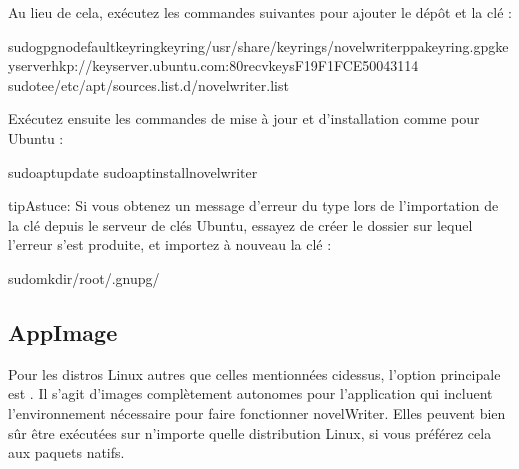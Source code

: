 \documentclass[a4paper,11pt,french]{sphinxmanual}
\begin{document}
\sphinxAtStartPar
Au lieu de cela, exécutez les commandes suivantes pour ajouter le dépôt et la clé :

\begin{sphinxVerbatim}[commandchars=\\\{\}]
sudogpg\PYGZhy{}\PYGZhy{}no\PYGZhy{}default\PYGZhy{}keyring\PYGZhy{}\PYGZhy{}keyring/usr/share/keyrings/novelwriter\PYGZhy{}ppa\PYGZhy{}keyring.gpg\PYGZhy{}\PYGZhy{}keyserverhkp://keyserver.ubuntu.com:80\PYGZhy{}\PYGZhy{}recv\PYGZhy{}keysF19F1FCE50043114
sudotee/etc/apt/sources.list.d/novelwriter.list
\end{sphinxVerbatim}

\sphinxAtStartPar
Exécutez ensuite les commandes de mise à jour et d’installation comme pour Ubuntu :

\begin{sphinxVerbatim}[commandchars=\\\{\}]
sudoaptupdate
sudoaptinstallnovelwriter
\end{sphinxVerbatim}

\begin{sphinxadmonition}{tip}{Astuce:}
\sphinxAtStartPar
Si vous obtenez un message d’erreur du type  lors de l’importation de la clé depuis le serveur de clés Ubuntu, essayez de créer le dossier sur lequel l’erreur s’est produite, et importez à nouveau la clé :

\begin{sphinxVerbatim}[commandchars=\\\{\}]
sudomkdir/root/.gnupg/
\end{sphinxVerbatim}
\end{sphinxadmonition}


\subsection{AppImage}
\label{\detokenize{int_started:appimage-releases}}
\sphinxAtStartPar
Pour les distros Linux autres que celles mentionnées ci\sphinxhyphen{}dessus, l’option principale est . Il s’agit d’images complètement autonomes pour l’application qui incluent l’environnement nécessaire pour faire fonctionner novelWriter. Elles peuvent bien sûr être exécutées sur n’importe quelle distribution Linux, si vous préférez cela aux paquets natifs.
\end{document}
